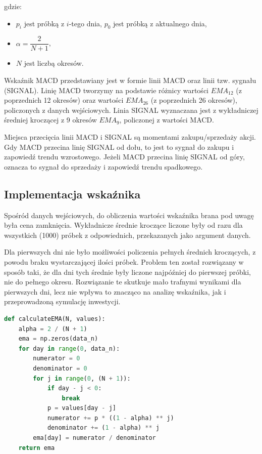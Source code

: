 \documentclass{article}
\begin{document}
\noindent
gdzie:
\begin{itemize}
    \item $p_i$ jest próbką z $i$-tego dnia, $p_0$ jest próbką z aktualnego dnia,
    \item $\alpha = \dfrac{2}{N + 1}$,
    \item $N$ jest liczbą okresów.
\end{itemize}

Wskaźnik MACD przedstawiany jest w formie linii MACD oraz linii tzw. sygnału (SIGNAL).
Linię MACD tworzymy na podstawie różnicy wartości $EMA_{12}$ (z poprzednich 12 okresów) oraz wartości $EMA_{26}$ (z poprzednich 26 okresów), policzonych z danych wejściowych. Linia SIGNAL wyznaczana jest z wykładniczej średniej kroczącej z 9 okresów $EMA_9$, policzonej z wartości MACD.

Miejsca przecięcia linii MACD i SIGNAL są momentami zakupu/sprzedaży akcji. Gdy MACD przecina linię SIGNAL od dołu, to jest to sygnał do zakupu i zapowiedź trendu wzrostowego. Jeżeli MACD przecina linię SIGNAL od góry, oznacza to sygnał do sprzedaży i zapowiedź trendu spadkowego.

\newpage
\subsection{Implementacja wskaźnika}

Spośród danych wejściowych, do obliczenia wartości wskaźnika brana pod uwagę była cena zamknięcia. Wykładnicze średnie kroczące liczone były od razu dla wszystkich (1000) próbek z odpowiednich, przekazanych jako argument danych. 

Dla pierwszych dni nie było możliwości policzenia pełnych średnich kroczących, z powodu braku wystarczającej ilości próbek. Problem ten został rozwiązany w sposób taki, że dla dni tych średnie były liczone najpóźniej do pierwszej próbki, nie do pełnego okresu. Rozwiązanie te skutkuje mało trafnymi wynikami dla pierwszych dni, lecz nie wpływa to znacząco na analizę wskaźnika, jak i przeprowadzoną symulację inwestycji.

\vspace{0.75em}
\begin{lstlisting}[language=Python, caption=Implementacja obliczania wykładniczej średniej kroczącej]
def calculateEMA(N, values):
    alpha = 2 / (N + 1)
    ema = np.zeros(data_n)
    for day in range(0, data_n):
        numerator = 0
        denominator = 0
        for j in range(0, (N + 1)):
            if day - j < 0:
                break
            p = values[day - j]
            numerator += p * ((1 - alpha) ** j)
            denominator += (1 - alpha) ** j
        ema[day] = numerator / denominator
    return ema
\end{lstlisting}
\vspace{1em}
\end{document}
